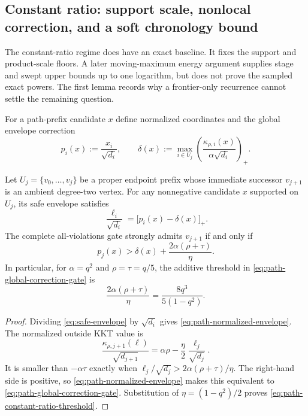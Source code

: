 \subsection{Constant ratio: support scale, nonlocal correction, and a soft chronology bound}
\label{sec:path-constant-ratio}

The constant-ratio regime does have an exact baseline.  It fixes the support
and product-scale floors.  A later moving-maximum energy argument supplies
stage and swept upper bounds up to one logarithm, but does not prove the
sampled exact powers.  The first lemma records why a frontier-only recurrence
cannot settle the remaining question.

For a path-prefix candidate $x$ define normalized coordinates and the global
envelope correction
\begin{equation}
 p_i(x):=\frac{x_i}{\sqrt{d_i}},
 \qquad
 \delta(x):=
 \max_{i\in U_j}
 \left(\frac{\kappa_{\rho,i}(x)}{\alpha\sqrt{d_i}}\right)_+.
 \label{eq:path-constant-ratio-correction}
\end{equation}

\begin{lemma}
\label{lem:path-global-envelope-gate}
Let $U_j=\{v_0,\ldots,v_j\}$ be a proper endpoint prefix whose immediate
successor $v_{j+1}$ is an ambient degree-two vertex.  For any nonnegative
candidate $x$ supported on $U_j$, its safe envelope satisfies
\begin{equation}
 \frac{\ell_i}{\sqrt{d_i}}
 =\bigl[p_i(x)-\delta(x)\bigr]_+.
 \label{eq:path-normalized-envelope}
\end{equation}
The complete all-violations gate strongly admits $v_{j+1}$ if and only if
\begin{equation}
 p_j(x)>\delta(x)+\frac{2\alpha(\rho+\tau)}{\eta}.
 \label{eq:path-global-correction-gate}
\end{equation}
In particular, for $\alpha=q^2$ and $\rho=\tau=q/5$, the additive threshold
in \cref{eq:path-global-correction-gate} is
\begin{equation}
 \frac{2\alpha(\rho+\tau)}{\eta}
 =\frac{8q^3}{5(1-q^2)}.
 \label{eq:path-constant-ratio-threshold}
\end{equation}
\end{lemma}

\begin{proof}
Dividing \cref{eq:safe-envelope} by $\sqrt{d_i}$ gives
\cref{eq:path-normalized-envelope}.  The normalized outside KKT value is
\begin{equation*}
 \frac{\kappa_{\rho,j+1}(\ell)}{\sqrt{d_{j+1}}}
 =\alpha\rho-\frac{\eta}{2}
   \frac{\ell_j}{\sqrt{d_j}}.
\end{equation*}
It is smaller than $-\alpha\tau$ exactly when
$\ell_j/\sqrt{d_j}>2\alpha(\rho+\tau)/\eta$.  The right-hand side is positive, so
\cref{eq:path-normalized-envelope} makes this equivalent to
\cref{eq:path-global-correction-gate}.  Substitution of
$\eta=(1-q^2)/2$ proves \cref{eq:path-constant-ratio-threshold}.
\end{proof}

